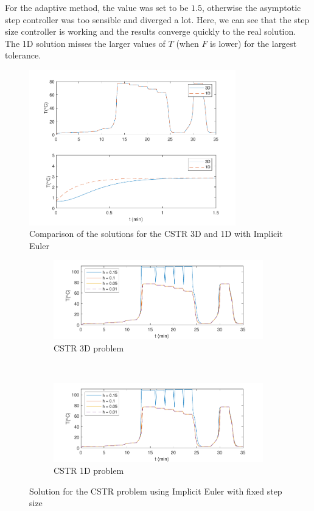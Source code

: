 For the adaptive method, the value  was set to be $1.5$, otherwise the asymptotic step controller was too sensible and diverged a lot. Here, we can see that the step size controller is working and the results converge quickly to the real solution. The 1D solution misses the larger values of $T$ (when $F$ is lower) for the largest tolerance. 
\begin{figure}[H]
    \centering
    \includegraphics[width=0.8\textwidth]{images/3/3_5_3D_vs_1D.pdf}
    \caption{Comparison of the solutions for the CSTR 3D and 1D with Implicit Euler}
    \label{3_5_3D_vs_1D}
\end{figure}

\begin{figure}[H]
\centering
    \begin{subfigure}{0.8\linewidth}
        \centering
        \includegraphics[width=1\linewidth]{images/3/3_5_3D_hs.pdf} 
        \caption{CSTR 3D problem}
    \end{subfigure} \\
    \begin{subfigure}{0.8\linewidth}
        \centering
        \includegraphics[width=1\linewidth]{images/3/3_5_1D_hs.pdf}
        \caption{CSTR 1D problem}
    \end{subfigure}
    \caption{Solution for the CSTR problem using Implicit Euler with fixed step size}
    \label{3_5_3D_1D_hs}
\end{figure}

